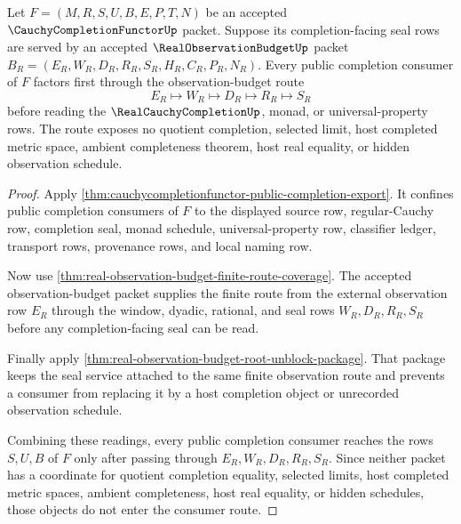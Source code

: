 \begin{theorem}
\label{thm:cauchycompletionfunctor-observation-budget-factorization}
Let $F=(M,R,S,U,B,E,P,T,N)$ be an accepted $\CauchyCompletionFunctorUp$ packet. Suppose its completion-facing seal rows are served by an accepted $\RealObservationBudgetUp$ packet $B_R=(E_R,W_R,D_R,R_R,S_R,H_R,C_R,P_R,N_R)$. Every public completion consumer of $F$ factors first through the observation-budget route
$$
E_R \longmapsto W_R \longmapsto D_R \longmapsto R_R \longmapsto S_R
$$
before reading the $\RealCauchyCompletionUp$, monad, or universal-property rows. The route exposes no quotient completion, selected limit, host completed metric space, ambient completeness theorem, host real equality, or hidden observation schedule.
\end{theorem}
\begin{proof}
Apply \autoref{thm:cauchycompletionfunctor-public-completion-export}. It confines public completion consumers of $F$ to the displayed source row, regular-Cauchy row, completion seal, monad schedule, universal-property row, classifier ledger, transport rows, provenance rows, and local naming row.

Now use \autoref{thm:real-observation-budget-finite-route-coverage}. The accepted observation-budget packet supplies the finite route from the external observation row $E_R$ through the window, dyadic, rational, and seal rows $W_R,D_R,R_R,S_R$ before any completion-facing seal can be read.

Finally apply \autoref{thm:real-observation-budget-root-unblock-package}. That package keeps the seal service attached to the same finite observation route and prevents a consumer from replacing it by a host completion object or unrecorded observation schedule.

Combining these readings, every public completion consumer reaches the rows $S,U,B$ of $F$ only after passing through $E_R,W_R,D_R,R_R,S_R$. Since neither packet has a coordinate for quotient completion equality, selected limits, host completed metric spaces, ambient completeness, host real equality, or hidden schedules, those objects do not enter the consumer route.
\end{proof}


